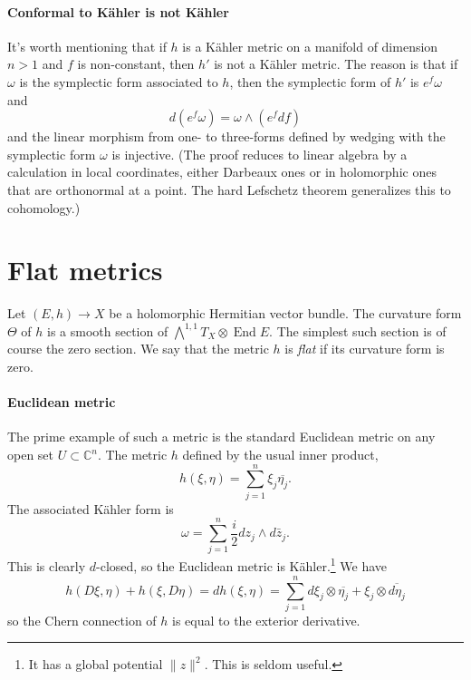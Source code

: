 \documentclass[11pt]{article}
\newcommand{\kk}[1]{\mathbb{#1}}
\DeclareMathOperator{\End}{End}
\begin{document}
\paragraph{Conformal to K\"ahler is not K\"ahler}
\label{sec:org7b1cfdf}

It's worth mentioning that if \(h\) is a K\"ahler metric on a manifold of dimension \(n > 1\) and \(f\) is non-constant, then \(h'\) is not a K\"ahler metric. The reason is that if \(\omega\) is the symplectic form associated to \(h\), then the symplectic form of \(h'\) is \(e^f \omega\) and
$$
d(e^f \omega) = \omega \wedge (e^f df)
$$
and the linear morphism from one- to three-forms defined by wedging with the symplectic form \(\omega\) is injective. (The proof reduces to linear algebra by a calculation in local coordinates, either Darbeaux ones or in holomorphic ones that are orthonormal at a point. The hard Lefschetz theorem generalizes this to cohomology.)

\section{Flat metrics}
\label{sec:org504b250}

Let $(E,h) \to X$ be a holomorphic Hermitian vector bundle. The curvature form $\Theta$ of $h$ is a smooth section of $\bigwedge^{1,1}T_X \otimes \End E$. The simplest such section is of course the zero section. We say that the metric $h$ is \emph{flat} if its curvature form is zero.


\paragraph{Euclidean metric}

The prime example of such a metric is the standard Euclidean metric on any open set $U \subset \kk C^n$. The metric $h$ defined by the usual inner product,
$$
h(\xi, \eta) = \sum_{j=1}^n \xi_j \overline{\eta_j}.
$$
The associated K\"ahler form is
$$
\omega = \sum_{j=1}^n \frac{i}{2} dz_j \wedge d\bar z_j.
$$
This is clearly $d$-closed, so the Euclidean metric is K\"ahler.\footnote{It has a global potential $\|z\|^2$. This is seldom useful.} We have
$$
h(D\xi, \eta) + h(\xi, D\eta)
= d h(\xi, \eta)
= \sum_{j=1}^n d\xi_j \otimes \overline{\eta_j} + \xi_j \otimes \overline{d\eta_j}
$$
so the Chern connection of $h$ is equal to the exterior derivative.

\end{document}
